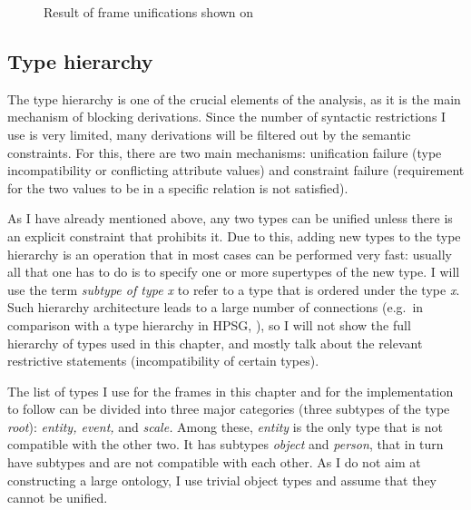 \begin{figure}
\caption{Result of frame unifications shown on  \label{frame:love}}
\end{figure}


\subsection{Type hierarchy}\label{section:types}
The type hierarchy is one of the crucial elements of the analysis, as it is the main mechanism of blocking derivations. Since the number of syntactic restrictions I use is very limited, many derivations will be filtered out by the semantic constraints. For this, there are two main mechanisms: unification failure (type incompatibility or conflicting attribute values) and constraint failure (requirement for the two values to be in a specific relation is not satisfied). 

As I have already mentioned above, any two types can be unified unless there is an explicit constraint that prohibits it. Due to this, adding new types to the type hierarchy is an operation that in most cases can be performed very fast: usually all that one has to do is to specify one or more supertypes of the new type. I will use the term \textit{subtype of type x} to refer to a type that is ordered under the type \textit{x}. Such hierarchy architecture leads to a large number of connections (e.g.\ in comparison with a type hierarchy in HPSG, \citealt{PollardSag:94}), so I will not show the full hierarchy of types used in this chapter, and mostly talk about the relevant restrictive statements (incompatibility of certain types).

The list of types I use for the frames in this chapter and for the implementation to follow can be divided into three major categories (three subtypes of the type \textit{root}): \textit{entity, event,} and \textit{scale.} Among these, \textit{entity} is the only type that is not compatible with the other two. It has subtypes \textit{object} and \textit{person}, that in turn have subtypes and are not compatible with each other. As I do not aim at constructing a large ontology, I use trivial object types and assume that they cannot be unified.


